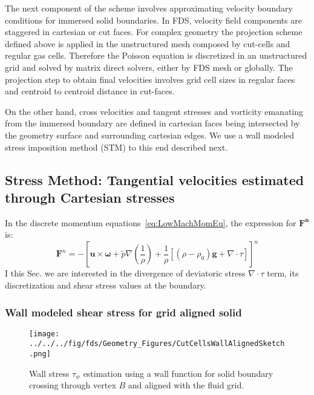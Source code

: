 The next component of the scheme involves approximating velocity boundary conditions for immersed solid boundaries. In FDS, velocity field components are staggered in cartesian or cut faces. 
For complex geometry the projection scheme defined above is applied in the unstructured mesh composed by cut-cells and regular gas cells. Therefore the Poisson equation is discretized in an unstructured grid and solved by matrix direct solvers, either by FDS mesh or globally. The projection step to obtain final velocities involves grid cell sizes in regular faces and centroid to centroid distance in cut-faces.

On the other hand, cross velocities and tangent stresses and vorticity emanating from the immersed boundary are defined in cartesian faces being intersected by the geometry surface and surrounding cartesian edges. We use a wall modeled stress imposition method (STM) to this end described next.
 
\subsection{Stress Method: Tangential velocities estimated through Cartesian stresses}

In the discrete momentum equations~\eqref{eq:LowMachMomEu}, the expression for $\mathbf{F^n}$ is:
%
\begin{equation}
   \mathbf{F}^n = -\left[ \mathbf{u} \times \boldsymbol{\omega} + \tilde{p} \nabla \left( \frac{1}{\rho} \right) 
   + \frac{1}{\rho} \left[ (\rho-\rho_0) \mathbf{g} + \nabla \cdot \tau \right]  \right]^n \label{eqn:momfn}
\end{equation} 
%
I this Sec. we are interested in the divergence of deviatoric stress $ \nabla \cdot \tau$ term, its discretization and shear stress values at the boundary.

\subsubsection{Wall modeled shear stress for grid aligned solid}

\begin{figure}[h]
      \centering
       \texttt{[image: ../../../fig/fds/Geometry\_Figures/CutCellsWallAlignedSketch.png]}
      \caption{Wall stress $\tau_w$ estimation using a wall function for solid boundary crossing through vertex $B$ and aligned with the fluid grid.}
        \label{Fig:Strss}
\end{figure}
%

